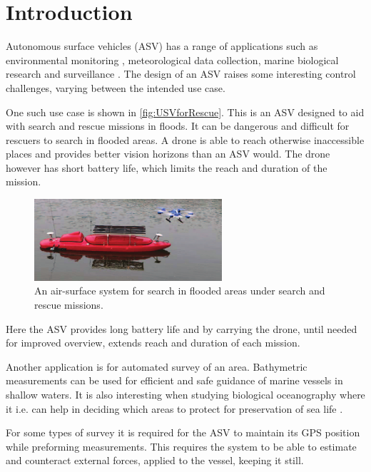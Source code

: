 \chapter{Introduction}

Autonomous surface vehicles (ASV) has a range of applications such as environmental monitoring \cite[p. 745]{MAHsieh}, meteorological data collection, marine biological research and surveillance \cite[p. 8-10]{FFahimi}.
The design of an ASV raises some interesting control challenges, varying between the intended use case.

One such use case is shown in \autoref{fig:USVforRescue}. 
This is an ASV designed to aid with search and rescue missions in floods. 
It can be dangerous and difficult for rescuers to search in flooded areas. 
A drone is able to reach otherwise inaccessible places and provides better vision horizons than an ASV would. 
The drone however has short battery life, which limits the reach and duration of the mission.
%
\begin{figure}[H]
  \vspace{3mm}
  \includegraphics[width=0.62\textwidth]{figures/USVforRescue.pdf}
  \caption{An air-surface system for search in flooded areas under search and rescue missions.\cite{JZhang}}
  \label{fig:USVforRescue}
\end{figure}
\vspace{-6mm}
%
Here the ASV provides long battery life and by carrying the drone, until needed for improved overview, extends reach and duration of each mission.\cite{JZhang}



Another application is for automated survey of an area.
Bathymetric measurements can be used for efficient and safe guidance of marine vessels in shallow waters. 
It is also interesting when studying biological oceanography where it i.e. can help in deciding which areas to protect for preservation of sea life \cite{NOService}. 

For some types of survey it is required for the ASV to maintain its GPS position while preforming measurements. 
This requires the system to be able to estimate and counteract external forces, applied to the vessel, keeping it still. 

